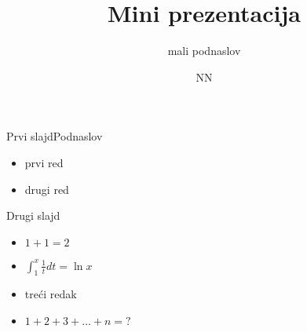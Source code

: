 \documentclass[%
handout, %
t,%
]{beamer}
\title{Mini prezentacija}
\subtitle{ mali podnaslov }
\author{NN}
\begin{document}
\maketitle




\begin{frame}{Prvi slajd}{Podnaslov}
\begin{itemize} 
 \item prvi red
 \item drugi red
\end{itemize}

\end{frame}

% 
\begin{frame}{Drugi slajd}
    \begin{itemize}
    \item $1+1=2$
    \item $\displaystyle \int_1^x \frac{1}t dt= \ln x$
    \item tre\'ci redak
    \item $1+2+3+\dots +n = ?$
    \end{itemize}
\end{frame}
\end{document}
